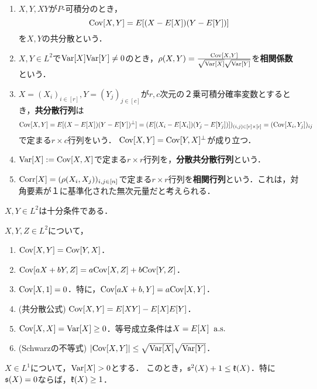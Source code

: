 \documentclass[uplatex,dvipdfmx]{jsreport}
\begin{document}
\begin{definition}\mbox{}
    \begin{enumerate}
        \item $X,Y,XY$が$P$-可積分のとき，
        \[\mathrm{Cov}[X,Y]=E[(X-E[X])(Y-E[Y])]\]
        を$X,Y$の共分散という．
        \item $X,Y\in L^2$で$\mathrm{Var}[X]\mathrm{Var}[Y]\ne 0$のとき，$\rho(X,Y)=\frac{\mathrm{Cov}[X,Y]}{\sqrt{\mathrm{Var}[X]}\sqrt{\mathrm{Var}[Y]}}$を\textbf{相関係数}という．
        \item $X=(X_i)_{i\in[r]},Y=(Y_j)_{j\in[c]}$が$r,c$次元の２乗可積分確率変数とするとき，\textbf{共分散行列}は
        \[\mathrm{Cov}[X,Y]=E[(X-E[X])(Y-E[Y])^\perp]=(E[(X_i-E[X_i])(Y_j-E[Y_j])])_{(i,j)\in[r]\times[c]}=(\mathrm{Cov}[X_i,Y_j])_{ij}\]
        で定まる$r\times c$行列をいう．
        $\mathrm{Cov}[X,Y]=\mathrm{Cov}[Y,X]^\perp$が成り立つ．
        \item $\mathrm{Var}[X]:=\mathrm{Cov}[X,X]$で定まる$r\times r$行列を，\textbf{分散共分散行列}という．
        \item $\mathrm{Corr}[X]=(\rho(X_i,X_j))_{i,j\in[n]}$で定まる$r\times r$行列を\textbf{相関行列}という．これは，対角要素が１に基準化された無次元量だと考えられる．
    \end{enumerate}
\end{definition}
\begin{remarks}
    $X,Y\in L^2$は十分条件である．
\end{remarks}

\begin{proposition}\label{prop-1d-covariance}
    $X,Y,Z\in L^2$について，
    \begin{enumerate}
        \item $\mathrm{Cov}[X,Y]=\mathrm{Cov}[Y,X]$．
        \item $\mathrm{Cov}[aX+bY,Z]=a\mathrm{Cov}[X,Z]+b\mathrm{Cov}[Y,Z]$．
        \item $\mathrm{Cov}[X,1]=0$．特に，$\mathrm{Cov}[aX+b,Y]=a\mathrm{Cov}[X,Y]$．
        \item (共分散公式) $\mathrm{Cov}[X,Y]=E[XY]-E[X]E[Y]$．
        \item $\mathrm{Cov}[X,X]=\mathrm{Var}[X]\ge 0$．等号成立条件は$X=E[X]\;\;\mathrm{a.s.}$
        \item (Schwarzの不等式) $\lvert\mathrm{Cov}[X,Y]\rvert\le\sqrt{\mathrm{Var}[X]}\sqrt{\mathrm{Var}[Y]}$．
    \end{enumerate}
\end{proposition}

\begin{proposition}[Pearsonの不等式]
    $X\in L^1$について，$\mathrm{Var}[X]>0$とする．
    このとき，$\mathfrak{s}^2(X)+1\le\mathfrak{k}(X)$．特に$\mathfrak{s}(X)=0$ならば，$\mathfrak{k}(X)\ge 1$．
\end{proposition}
\end{document}
